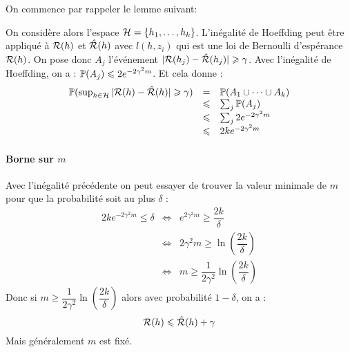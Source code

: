 
On commence par rappeler le lemme suivant: \vspace{3mm}
\vspace{2mm}

On considère alors l'espace $\mathcal{H} = \{ h_1, \dots, h_k \}$. L'inégalité de Hoeffding peut être appliqué à $\mathcal{R}(h)$ et $\hat{\mathcal{R}}(h)$ avec $l(h, z_i)$ qui est une loi de Bernoulli d'espérance $\mathcal{R}(h)$. On pose donc $A_j$ l'événement $| \mathcal{R}(h_j) - \hat{\mathcal{R}}(h_j) | \geqslant \gamma$. Avec l'inégalité de Hoeffding, on a : $\mathbb{P}(A_j) \leqslant 2 e^{-2 \gamma^2 m}$. Et cela donne :
$$ \begin{array}{lll}
	\mathbb{P}(\sup_{h \in \mathcal{H}} | \mathcal{R}(h) - \hat{\mathcal{R}}(h) | \geqslant \gamma )
	 & = & \mathbb{P}(A_1 \cup \dots \cup A_k) \\
	 & \leqslant & \sum_j \mathbb{P}(A_j) \\
	 & \leqslant & \sum_j 2 e^{-2 \gamma^2 m} \\
	 & \leqslant & 2k e^{-2 \gamma^2 m}
\end{array} $$

\paragraph{Borne sur $m$}
Avec l'inégalité précédente on peut essayer de trouver la valeur minimale de $m$ pour que la probabilité soit au plus $\delta$ :
$$ \begin{array}{lll}
	2k e^{-2 \gamma^2 m} \leqslant \delta
	 & \Leftrightarrow & e^{2 \gamma^2 m} \geqslant \dfrac{2k}{\delta} \\
	 & \Leftrightarrow & 2 \gamma^2 m \geqslant \ln \left( \dfrac{2k}{\delta} \right) \\
	 & \Leftrightarrow & m \geqslant \dfrac{1}{2 \gamma^2} \ln \left( \dfrac{2k}{\delta} \right)
\end{array} $$
Donc si $m \geqslant \dfrac{1}{2 \gamma^2} \ln \left( \dfrac{2k}{\delta} \right)$ alors avec probabilité $1 - \delta$, on a :
$$ \mathcal{R}(h) \leqslant \hat{\mathcal{R}}(h) + \gamma $$
Mais généralement $m$ est fixé.

